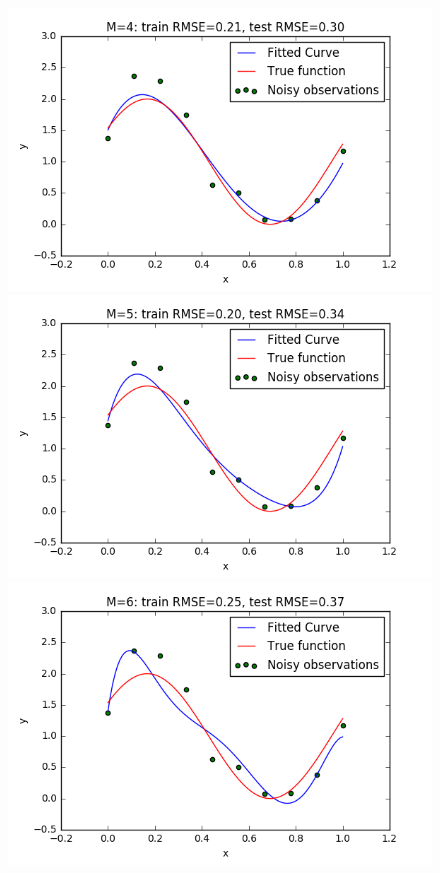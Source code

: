\documentclass[a4paper]{article}
\begin{document}
\newpage 
\begin{figure}[h!]
\begin{multicols}{2}
    \includegraphics[width=\linewidth]{Images/curvefit_m4_n_10.png}\par
    \includegraphics[width=\linewidth]{Images/curvefit_m5_n_10.png}\par
    \includegraphics[width=\linewidth]{Images/curvefit_m6_n_10.png}\par

\end{multicols}
\end{figure}
\end{document}
